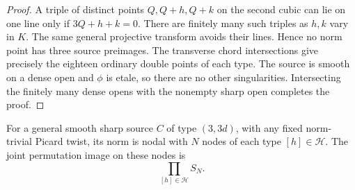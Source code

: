 \begin{proof}
A triple of distinct points $Q,Q+h,Q+k$ on the second cubic can
lie on one line only if $3Q+h+k=0$. There are finitely many such
triples as $h,k$ vary in $K$. The same general projective transform
avoids their lines. Hence no norm point has three source preimages.
The transverse chord intersections give precisely the eighteen
ordinary double points of each type. The source is smooth on a
dense open and $\phi$ is etale, so there are no other singularities.
Intersecting the finitely many dense opens with the nonempty sharp
open completes the proof.
\end{proof}

\begin{lemma}
\label{lem:mixed-odd-node-product-candidate}
For a general smooth sharp source $C$ of type $(3,3d)$, with any
fixed norm-trivial Picard twist, its norm is nodal with $N$ nodes
of each type $[h]\in\mathcal H$. The joint permutation image on
these nodes is
\[
                         \prod_{[h]\in\mathcal H}S_N.
\]
\end{lemma}
